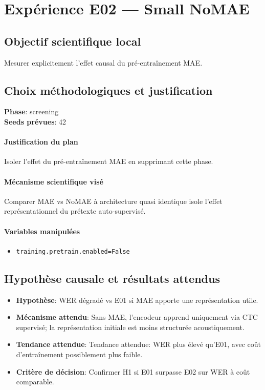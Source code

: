 \documentclass[11pt,a4paper]{article}
\begin{document}
\section{Expérience E02 --- Small NoMAE}
\subsection{Objectif scientifique local}
Mesurer explicitement l'effet causal du pré-entraînement MAE.

\subsection{Choix méthodologiques et justification}
\textbf{Phase}: screening\\
\textbf{Seeds prévues}: 42\\


\paragraph{Justification du plan}
Isoler l'effet du pré-entraînement MAE en supprimant cette phase.

\paragraph{Mécanisme scientifique visé}
Comparer MAE vs NoMAE à architecture quasi identique isole l'effet représentationnel du prétexte auto-supervisé.

\paragraph{Variables manipulées}
\begin{itemize}
\item \texttt{training.pretrain.enabled=False}
\end{itemize}

\subsection{Hypothèse causale et résultats attendus}
\begin{itemize}[leftmargin=1.2cm]
\item \textbf{Hypothèse}: WER dégradé vs E01 si MAE apporte une représentation utile.
\item \textbf{Mécanisme attendu}: Sans MAE, l'encodeur apprend uniquement via CTC supervisé; la représentation initiale est moins structurée acoustiquement.
\item \textbf{Tendance attendue}: Tendance attendue: WER plus élevé qu'E01, avec coût d'entraînement possiblement plus faible.
\item \textbf{Critère de décision}: Confirmer H1 si E01 surpasse E02 sur WER à coût comparable.
\end{itemize}
\end{document}
